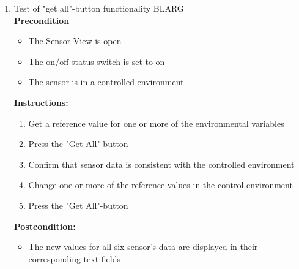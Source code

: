 \documentclass[a4paper]{article}
\newlength{\testlabellength}
\newenvironment{testlist}{\begin{enumerate}[label=\bfseries Instruction \thesubsection.\arabic* , labelindent=0pt, labelwidth=\testlabellength , leftmargin=2cm]}{\end{enumerate}}
\newenvironment{precondition}{
{\color{white}BLARG}\\ 
\textbf{Precondition}
\begin{itemize}[labelindent=0cm, labelwidth=2cm , leftmargin=1cm]
}
{\end{itemize}}
\newenvironment{instruction}{
\textbf{Instructions:}
\begin{enumerate}[label=\bfseries  \arabic*., labelindent=0cm, labelwidth=2cm , leftmargin=1cm]
}
{\end{enumerate}}
\newenvironment{postcondition}{
\textbf{Postcondition:}
\begin{itemize}[labelindent=0cm, labelwidth=2cm , leftmargin=1cm]
}
{\end{itemize}}
\begin{document}
\begin{appendices}
\begin{testlist}
	\item Test of "get all"-button functionality
		\begin{precondition}
			\item The Sensor View is open
			\item The on/off-status switch is set to on
			\item The sensor is in a controlled environment
		\end{precondition}
		\begin{instruction}
			\item Get a reference value for one or more of the environmental variables
			\item Press the "Get All"-button
			\item Confirm that sensor data is consistent with the controlled environment
			\item Change one or more of the reference values in the control environment
			\item Press the "Get All"-button
		\end{instruction}
		\begin{postcondition}
			\item The new values for all six sensor's data are displayed in their corresponding text fields
		\end{postcondition}


\end{testlist}
\end{appendices}
\end{document}
